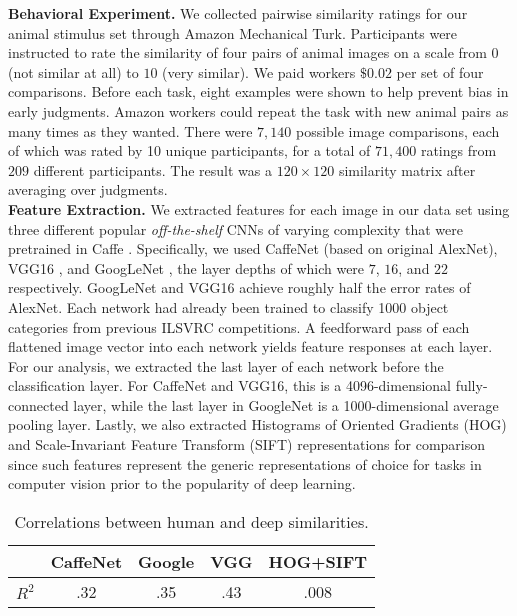 \documentclass[10pt,letterpaper]{article}
\begin{document}
\noindent \textbf{Behavioral Experiment.} We collected pairwise similarity ratings for our animal stimulus set through Amazon Mechanical Turk. Participants were instructed to rate the similarity of four pairs of animal images on a scale from $0$ (not similar at all) to $10$ (very similar). We paid workers $\$0.02$ per set of four comparisons. Before each task, eight examples were shown to help prevent bias in early judgments. Amazon workers could repeat the task with new animal pairs as many times as they wanted. There were $7,140$ possible image comparisons, each of which was rated by 10 unique participants, for a total of $71,400$ ratings from $209$ different participants. The result was a $120\times120$ similarity matrix after averaging over judgments.\\

\noindent \textbf{Feature Extraction.} We extracted features for each image in our data set using three different popular \textit{off-the-shelf} CNNs of varying complexity that were pretrained in Caffe \citep*{jia2014caffe}. Specifically, we used CaffeNet (based on original AlexNet), VGG16 \citep*{simonyan2014very}, and GoogLeNet \citep*{szegedy2014going}, the layer depths of which were $7$, $16$, and $22$ respectively. GoogLeNet and VGG16 achieve roughly half the error rates of AlexNet. Each network had already been trained to classify 1000 object categories from previous ILSVRC competitions. A feedforward pass of each flattened image vector into each network yields feature responses at each layer. For our analysis, we extracted the last layer of each network before the classification layer. For CaffeNet and VGG16, this is a 4096-dimensional fully-connected layer, while the last layer in GoogleNet is a 1000-dimensional average pooling layer. Lastly, we also extracted Histograms of Oriented Gradients (HOG) and Scale-Invariant Feature Transform (SIFT) representations for comparison since such features represent the generic representations of choice for tasks in computer vision prior to the popularity of deep learning. \\

\begin{table}[!t]
\caption{Correlations between human and deep similarities.}
\begin{center}
\label{vanilla-results}
\begin{tabular}{lcccc}
          & CaffeNet & Google & VGG & HOG+SIFT \\
\hline
$R^{2}$   & .32 & .35 & .43 & .008  \\
\end{tabular}
\end{center}
\end{table}
\end{document}
